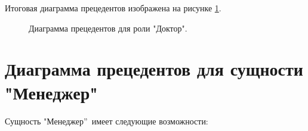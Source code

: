         Итоговая диаграмма прецедентов изображена на рисунке \ref{doctor_uml}.

        \begin{figure}[H]%
            \centering
            \caption{Диаграмма прецедентов для роли "Доктор".} \label{doctor_uml}
        \end{figure} 
    
    \section{Диаграмма прецедентов для сущности "Менеджер"\ }
        Сущность "Менеджер”\ имеет следующие возможности:

